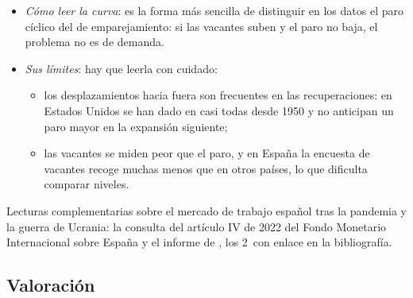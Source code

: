\documentclass[11pt]{article}
\begin{document}
\begin{itemize}
\item \emph{Cómo leer la curva}: es la forma más sencilla de distinguir en los datos el paro cíclico del de emparejamiento: si las vacantes suben y el paro no baja, el problema no es de demanda.
\item \emph{Sus límites}: hay que leerla con cuidado:
  \begin{itemize}
  \item los desplazamientos hacia fuera son frecuentes en las recuperaciones: en Estados Unidos se han dado en casi todas desde 1950 y no anticipan un paro mayor en la expansión siguiente\nocite{DiamondSahin2015Shifts};
  \item las vacantes se miden peor que el paro, y en España la encuesta de vacantes recoge muchas menos que en otros países, lo que dificulta comparar niveles.
  \end{itemize}
\end{itemize}

\begin{anotaciones}
Lecturas complementarias sobre el mercado de trabajo español tras la pandemia y la guerra de Ucrania: la consulta del artículo IV de 2022 del Fondo Monetario Internacional sobre España\nocite{FMI2023Spain} y el informe de \textcite{BoscaEtAl2023Ucrania}, los 2~con enlace en la bibliografía.
\end{anotaciones}

\subsection{Valoración}\label{sec:dmp-valoracion}
\end{document}
